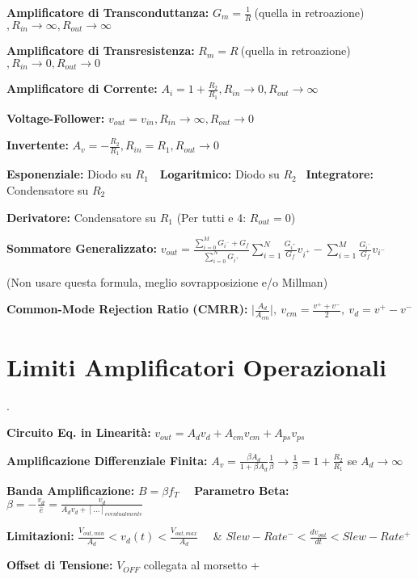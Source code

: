 \documentclass[12pt]{extarticle}
\begin{document}
{\bf Amplificatore di Transconduttanza:} $\displaystyle G_m = \frac{1}{R} \ $(quella in retroazione)$, R_{in} \to \infty, R_{out} \to \infty$

{\bf Amplificatore di Transresistenza: } $\displaystyle R_m = R \ $(quella in retroazione)$, R_{in} \to 0, R_{out} \to 0$

{\bf Amplificatore di Corrente:} $\displaystyle A_i = 1+\frac{R_2}{R_1}, R_{in} \to 0, R_{out} \to \infty$

{\bf Voltage-Follower:} $\displaystyle v_{out} = v_{in}, R_{in} \to \infty, R_{out} \to 0$

{\bf Invertente:} $\displaystyle A_v = -\frac{R_2}{R_1}, R_{in} = R_1, R_{out} \to 0$

{\bf Esponenziale:} Diodo su $R_1$\ \ {\bf Logaritmico:} Diodo su $R_2$ \ {\bf Integratore:} Condensatore su $R_2$

{\bf Derivatore:} Condensatore su $R_1$ (Per tutti e 4: $R_{out} = 0$)


{\bf Sommatore Generalizzato:} $\displaystyle v_{out} = \frac{\sum_{i=0}^M G_{i^-} + G_f}{\sum_{i=0}^N G_{i^+}} \sum_{i=1}^N \frac{G_{i^+}}{G_f}v_{i^+}-\sum_{i=1}^M\frac{G_{i^-}}{G_f}v_{i^-}$ 

(Non usare questa formula, meglio sovrapposizione e/o Millman)

{\bf Common-Mode Rejection Ratio (CMRR):} $\displaystyle \bigg |\frac{A_d}{A_{cm}} \bigg |, \ v_{cm} = \frac{v^++v^-}{2}, \ v_d = v^+-v^-$


\section{Limiti Amplificatori Operazionali}.

{\bf Circuito Eq. in Linearità:} $\displaystyle v_{out} = A_dv_d +A_{cm}v_{cm}+A_{ps}v_{ps}$

{\bf Amplificazione Differenziale Finita:} $\displaystyle A_v = \frac{\beta A_d}{1+\beta A_d}\frac{1}{\beta} \to \frac{1}{\beta} = 1+\frac{R_2}{R_1}$ se $A_d \to \infty$

{\bf Banda Amplificazione:} $\displaystyle B = \beta f_T$ \ \ {\bf Parametro Beta:} $\displaystyle \beta = -\frac{v_d}{\hat{e}} = \frac{v_d}{A_dv_d + [...]_{eventualmente}}$

{\bf Limitazioni:} $\displaystyle \frac{V_{out, min}}{A_d} < v_d(t) < \frac{V_{out, max}}{A_d}$ \ \ \&  $\displaystyle Slew-Rate^- < \frac{dv_{out}}{dt} < Slew-Rate^+$

{\bf Offset di Tensione:} $V_{OFF}$ collegata al morsetto +
\end{document}
